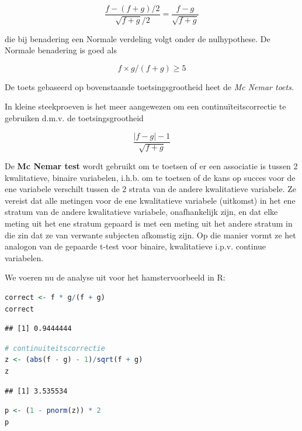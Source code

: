 \documentclass[
  12pt,dutch,coursenotes]{book}
\theoremstyle{definition}
\theoremstyle{definition}
\theoremstyle{definition}
\theoremstyle{definition}
\theoremstyle{remark}
\begin{document}
\begin{equation*}
\frac{f-(f+g)/2}{\sqrt{f+g}/2}=\frac{f-g}{\sqrt{f+g}}
\end{equation*}

die bij benadering een Normale verdeling volgt onder de nulhypothese.
De Normale benadering is goed als

\[f \times g/(f+g) \geq 5\]

De toets gebaseerd op bovenstaande toetsingsgrootheid heet de \emph{Mc Nemar toets}.

In kleine steekproeven is het meer aangewezen om een continuïteitscorrectie te gebruiken d.m.v. de toetsingsgrootheid

\begin{equation*}
\frac{|f-g|-1}{\sqrt{f+g}}
\end{equation*}

De \textbf{Mc Nemar test} wordt gebruikt om te toetsen of er een associatie is tussen 2 kwalitatieve, binaire variabelen, i.h.b. om te toetsen of de kans op succes voor de ene variabele verschilt tussen de 2 strata van de andere kwalitatieve variabele. Ze vereist dat alle metingen voor de ene kwalitatieve variabele (uitkomst) in het ene stratum van de andere kwalitatieve variabele, onafhankelijk zijn, en dat elke meting uit het ene stratum gepaard is met een meting uit het andere stratum in die zin dat ze van verwante subjecten afkomstig zijn. Op die manier vormt ze het analogon van de gepaarde t-test voor binaire, kwalitatieve i.p.v. continue variabelen.

We voeren nu de analyse uit voor het hamstervoorbeeld in R:

\begin{lstlisting}[language=R]
correct <- f * g/(f + g)
correct
\end{lstlisting}

\begin{lstlisting}
## [1] 0.9444444
\end{lstlisting}

\begin{lstlisting}[language=R]
# continuiteitscorrectie
z <- (abs(f - g) - 1)/sqrt(f + g)
z
\end{lstlisting}

\begin{lstlisting}
## [1] 3.535534
\end{lstlisting}

\begin{lstlisting}[language=R]
p <- (1 - pnorm(z)) * 2
p
\end{lstlisting}
\end{document}

